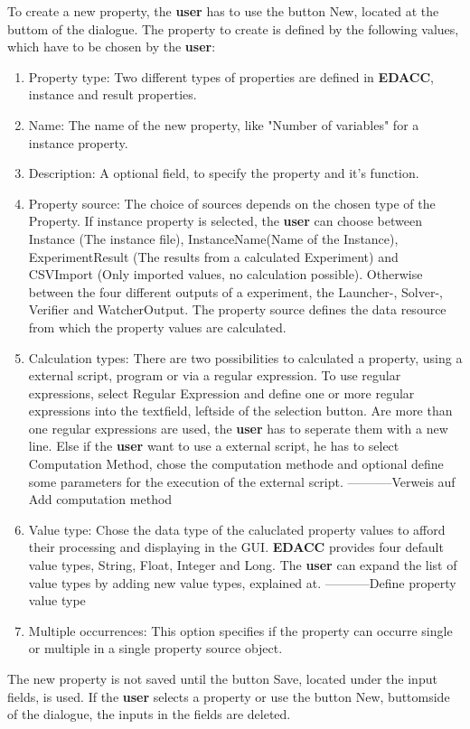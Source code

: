To create a new property, the \textbf{user} has to use the button New, located at the buttom of the dialogue. The property to create is defined by the following values, which have to be chosen by the \textbf{user}:
\begin{enumerate}
	\item Property type: Two different types of properties are defined in \textbf{EDACC}, instance and result properties. 
	\item Name: The name of the new property, like "Number of variables" for a instance property.
	\item Description: A optional field, to specify the property and it's function.
	\item Property source: The choice of sources depends on the chosen type of the Property. If instance property is selected, the \textbf{user} can choose between Instance (The instance file), InstanceName(Name of the Instance), ExperimentResult (The results from a calculated Experiment) and CSVImport (Only imported values, no calculation possible). Otherwise between the four different outputs of a experiment, the Launcher-, Solver-, Verifier and WatcherOutput. The property source defines the data resource from which the property values are calculated.
	\item Calculation types: There are two possibilities to calculated a property, using a external script, program or via a regular expression. To use regular expressions, select Regular Expression and define one or more regular expressions into the textfield, leftside of the selection button. Are more than one regular expressions are used, the \textbf{user} has to seperate them with a new line. Else if the \textbf{user} want to use a external script, he has to select Computation Method, chose the computation methode and optional define some parameters for the execution of the external script. -----------Verweis auf Add computation method
	\item Value type: Chose the data type of the caluclated property values to afford their processing and displaying in the GUI. \textbf{EDACC} provides four default value types, String, Float, Integer and Long. The \textbf{user} can expand the list of value types by adding new value types, explained at.   -----------Define property value type
	\item Multiple occurrences: This option specifies if the property can occurre single or multiple in a single property source object. 
\end{enumerate} 
\attention The new property is not saved until the button Save, located under the input fields, is used. If the \textbf{user} selects a property or use the button New, buttomside of the dialogue, the inputs in the fields are deleted. 

